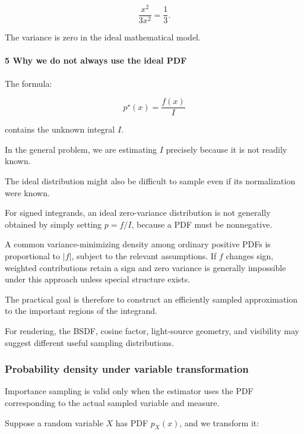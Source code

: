 \[
 \frac{x^2}{3x^2}=\frac13.
\]

The variance is zero in the ideal mathematical model.

\paragraph{5 Why we do not always use the ideal PDF}\label{02-foundations-ii-ch029-why-we-do-not-always-use-the-ideal-pdf}

\hypertarget{02-foundations-ii-ch029-why-we-do-not-always-use-the-ideal-pdf}{}

The formula:

\[
 p^\star(x)=\frac{f(x)}I
\]

contains the unknown integral \(I\).

In the general problem, we are estimating \(I\) precisely because it is not readily known.

The ideal distribution might also be difficult to sample even if its normalization were known.

For signed integrands, an ideal zero-variance distribution is not generally obtained by simply setting \(p=f/I\), because a PDF must be nonnegative.

A common variance-minimizing density among ordinary positive PDFs is proportional to \(|f|\), subject to the relevant assumptions. If \(f\) changes sign, weighted contributions retain a sign and zero variance is generally impossible under this approach unless special structure exists.

The practical goal is therefore to construct an efficiently sampled approximation to the important regions of the integrand.

For rendering, the BSDF, cosine factor, light-source geometry, and visibility may suggest different useful sampling distributions.

\subsubsection{Probability density under variable transformation}\label{02-foundations-ii-ch029-probability-density-under-variable-transformation}

\hypertarget{02-foundations-ii-ch029-probability-density-under-variable-transformation}{}

Importance sampling is valid only when the estimator uses the PDF corresponding to the actual sampled variable and measure.

Suppose a random variable \(X\) has PDF \(p_X(x)\), and we transform it:

